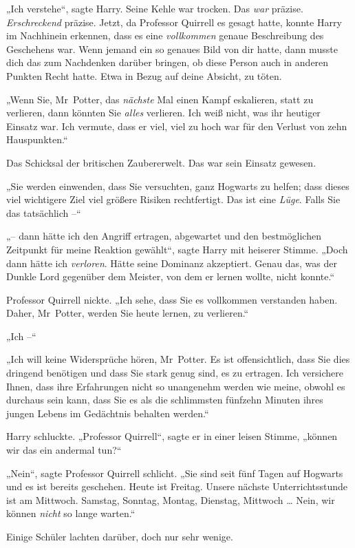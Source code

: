 {„Ich verstehe“, sagte Harry. Seine Kehle war trocken. Das \emph{war} präzise. \emph{Erschreckend} präzise. Jetzt, da Professor Quirrell es gesagt hatte, konnte Harry im Nachhinein erkennen, dass es eine \emph{vollkommen} genaue Beschreibung des Geschehens war. Wenn jemand ein so genaues Bild von dir hatte, dann musste dich das zum Nachdenken darüber bringen, ob diese Person auch in anderen Punkten Recht hatte. Etwa in Bezug auf deine Absicht, zu töten.

„Wenn Sie, Mr~Potter, das \emph{nächste} Mal einen Kampf eskalieren, statt zu verlieren, dann könnten Sie \emph{alles} verlieren. Ich weiß nicht, was ihr heutiger Einsatz war. Ich vermute, dass er viel, viel zu hoch war für den Verlust von zehn Hauspunkten.“

Das Schicksal der britischen Zaubererwelt. Das war sein Einsatz gewesen.

„Sie werden einwenden, dass Sie versuchten, ganz Hogwarts zu helfen; dass dieses viel wichtigere Ziel viel größere Risiken rechtfertigt. Das ist eine \emph{Lüge}. Falls Sie das tatsächlich --“

„-- dann hätte ich den Angriff ertragen, abgewartet und den bestmöglichen Zeitpunkt für meine Reaktion gewählt“, sagte Harry mit heiserer Stimme. „Doch dann hätte ich \emph{verloren}. Hätte seine Dominanz akzeptiert. Genau das, was der Dunkle Lord gegenüber dem Meister, von dem er lernen wollte, nicht konnte.“

Professor Quirrell nickte. „Ich sehe, dass Sie es vollkommen verstanden haben. Daher, Mr~Potter, werden Sie heute lernen, zu verlieren.“

„Ich --“

„Ich will keine Widersprüche hören, Mr~Potter. Es ist offensichtlich, dass Sie dies dringend benötigen und dass Sie stark genug sind, es zu ertragen. Ich versichere Ihnen, dass ihre Erfahrungen nicht so unangenehm werden wie meine, obwohl es durchaus sein kann, dass Sie es als die schlimmsten fünfzehn Minuten ihres jungen Lebens im Gedächtnis behalten werden.“

Harry schluckte. „Professor Quirrell“, sagte er in einer leisen Stimme, „können wir das ein andermal tun?“

„Nein“, sagte Professor Quirrell schlicht. „Sie sind seit fünf Tagen auf Hogwarts und es ist bereits geschehen. Heute ist Freitag. Unsere nächste Unterrichtsstunde ist am Mittwoch. Samstag, Sonntag, Montag, Dienstag, Mittwoch … Nein, wir können \emph{nicht} so lange warten.“

Einige Schüler lachten darüber, doch nur sehr wenige.

}
